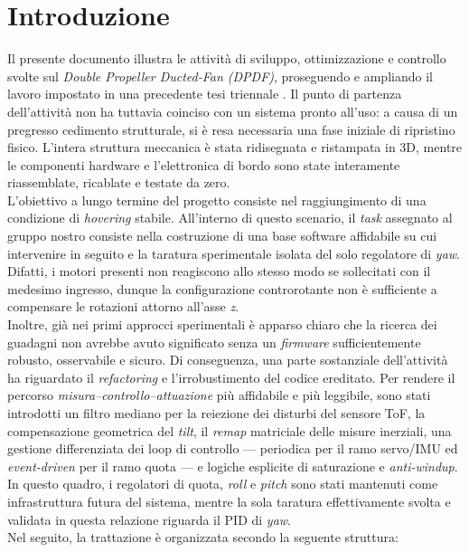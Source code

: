 \documentclass[11pt]{report}
\begin{document}
	\section*{Introduzione}
	
	Il presente documento illustra le attività di sviluppo, ottimizzazione e controllo svolte sul \textit{Double Propeller Ducted-Fan (DPDF)}, proseguendo e ampliando il lavoro impostato in una precedente tesi triennale \cite{Mincu2025}. Il punto di partenza dell'attività non ha tuttavia coinciso con un sistema pronto all'uso: a causa di un pregresso cedimento strutturale, si è resa necessaria una fase iniziale di ripristino fisico. L'intera struttura meccanica è stata ridisegnata e ristampata in 3D, mentre le componenti hardware e l'elettronica di bordo sono state interamente riassemblate, ricablate e testate da zero.\\
	L'obiettivo a lungo termine del progetto consiste nel raggiungimento di una condizione di \textit{hovering} stabile. All'interno di questo scenario, il \textit{task} assegnato al gruppo nostro consiste nella costruzione di una base software affidabile su cui intervenire in seguito e la taratura sperimentale isolata del solo regolatore di \textit{yaw}. Difatti, i motori presenti non reagiscono allo stesso modo se sollecitati con il medesimo ingresso, dunque la configurazione controrotante non è sufficiente a compensare le rotazioni attorno all'asse \textit{z}.\\
	Inoltre, già nei primi approcci sperimentali è apparso chiaro che la ricerca dei guadagni non avrebbe avuto significato senza un \textit{firmware} sufficientemente robusto, osservabile e sicuro. Di conseguenza, una parte sostanziale dell'attività ha riguardato il \textit{refactoring} e l'irrobustimento del codice ereditato. Per rendere il percorso \textit{misura--controllo--attuazione} più affidabile e più leggibile, sono stati introdotti un filtro mediano per la reiezione dei disturbi del sensore ToF, la compensazione geometrica del \textit{tilt}, il \textit{remap} matriciale delle misure inerziali, una gestione differenziata dei loop di controllo --- periodica per il ramo servo/IMU ed \textit{event-driven} per il ramo quota --- e logiche esplicite di saturazione e \textit{anti-windup}. In questo quadro, i regolatori di quota, \textit{roll} e \textit{pitch} sono stati mantenuti come infrastruttura futura del sistema, mentre la sola taratura effettivamente svolta e validata in questa relazione riguarda il PID di \textit{yaw}.\\
	Nel seguito, la trattazione è organizzata secondo la seguente struttura:
\end{document}
